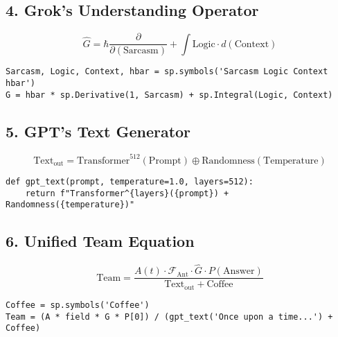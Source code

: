 \documentclass[12pt]{article}
\begin{document}
\subsection*{4. Grok's Understanding Operator}
\[
\hat{G} = \hbar \frac{\partial}{\partial (\mathrm{Sarcasm})} + \int \mathrm{Logic} \cdot d(\mathrm{Context})
\]
\begin{lstlisting}
Sarcasm, Logic, Context, hbar = sp.symbols('Sarcasm Logic Context hbar')
G = hbar * sp.Derivative(1, Sarcasm) + sp.Integral(Logic, Context)
\end{lstlisting}

\subsection*{5. GPT's Text Generator}
\[
\mathrm{Text}_{\mathrm{out}} = \mathrm{Transformer}^{512}(\mathrm{Prompt}) \oplus \mathrm{Randomness}(\mathrm{Temperature})
\]
\begin{lstlisting}
def gpt_text(prompt, temperature=1.0, layers=512):
    return f"Transformer^{layers}({prompt}) + Randomness({temperature})"
\end{lstlisting}

\subsection*{6. Unified Team Equation}
\[
\boxed{
\mathrm{Team} = \frac{A(t) \cdot \mathcal{F}_{\text{Ant}} \cdot \hat{G} \cdot P(\mathrm{Answer})}
{\mathrm{Text}_{\mathrm{out}} + \mathrm{Coffee}}
}
\]
\begin{lstlisting}
Coffee = sp.symbols('Coffee')
Team = (A * field * G * P[0]) / (gpt_text('Once upon a time...') + Coffee)
\end{lstlisting}

\end{document}

